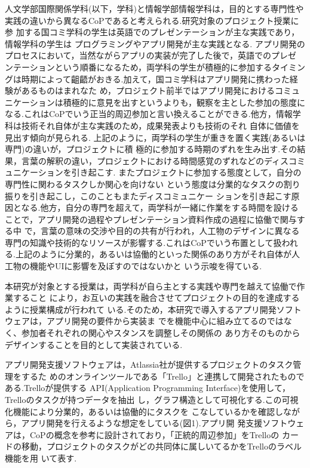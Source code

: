 \documentclass[submit,techrep]{ipsj}
\begin{document}
人文学部国際関係学科(以下，学科)と情報学部情報学科は，目的とする専門性や実践の違いから異なるCoPであると考えられる.研究対象のプロジェクト授業に参 加する国コミ学科の学生は英語でのプレゼンテーションが主な実践であり，情報学科の学生は プログラミングやアプリ開発が主な実践となる.  アプリ開発のプロセスにおいて，当然ながらアプリの実装が完了した後で，英語でのプレゼ ンテーションという順番になるため，両学科の学生が積極的に参加するタイミングは時期によって齟齬がおきる.加えて，国コミ学科はアプリ開発に携わった経験があるものはまれなた め，プロジェクト前半ではアプリ開発におけるコミュニケーションは積極的に意見を出すというよりも，観察を主とした参加の態度になる.これはCoPでいう正当的周辺参加と言い換えることができる.他方，情報学科は技術それ自体が主な実践のため，成果発表よりも技術のそれ 自体に価値を見出す傾向が見られる.  上記のように，両学科の学生が重きを置く実践(あるいは専門)の違いが，プロジェクトに積 極的に参加する時期のずれを生み出す.その結果，言葉の解釈の違い，プロジェクトにおける時間感覚のずれなどのディスコミュニケーションを引き起こす.  またプロジェクトに参加する態度として，自分の専門性に関わるタスクしか関心を向けない という態度は分業的なタスクの割り振りを引き起こし，このこともまたディスコミュニケー ションを引き起こす原因となる.他方，自分の専門を超えて，両学科が一緒に作業をする時間を設けることで，アプリ開発の過程やプレゼンテーション資料作成の過程に協働で関与する中 で，言葉の意味の交渉や目的の共有が行われ，人工物のデザインに異なる専門の知識や技術的なリソースが影響する.これはCoPでいう布置として扱われる.上記のように分業的，あるいは協働的といった関係のあり方がそれ自体が人工物の機能やUIに影響を及ぼすのではないかと いう示唆を得ている.


本研究が対象とする授業は，両学科が自ら主とする実践や専門を越えて協働で作業すること により，お互いの実践を融合させてプロジェクトの目的を達成するように授業構成が行われて いる.そのため，本研究で導入するアプリ開発ソフトウェアは，アプリ開発の要件から実装ま でを機能中心に組み立てるのではなく、参加者それぞれの関心やスタンスを調整しその関係の あり方そのものからデザインすることを目的として実装されている.


 アプリ開発支援ソフトウェアは，Atlassia社が提供するプロジェクトのタスク管理をするた めのオンラインツールである「Trello」と連携して開発されたものである.Trelloが提供する API(Application Programming Interface)を使用して，Trelloのタスクが持つデータを抽出 し，グラフ構造として可視化する.この可視化機能により分業的，あるいは協働的にタスクを こなしているかを確認しながら，アプリ開発を行えるような想定をしている(図1).アプリ開 発支援ソフトウェアは，CoPの概念を参考に設計されており，「正統的周辺参加」をTrelloの カードの移動，プロジェクトのタスクがどの共同体に属しいてるかをTrelloのラベル機能を用 いて表す.
\end{document}

